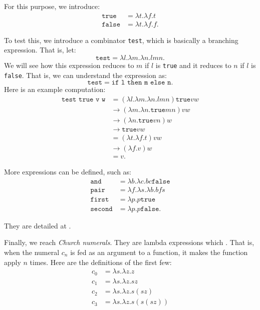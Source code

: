 For this purpose, we introduce:
\begin{align*}
  \texttt{true} &= \lambda t . \lambda f . t \\
  \texttt{false} &= \lambda t . \lambda f . f.
\end{align*}

To test this, we introduce a combinator \texttt{test}, which
is basically a branching expression. That is, let:
\[
  \texttt{test} = \lambda l . \lambda m . \lambda n . lmn.
\]
We will see how this expression reduces to $ m $ if $ l $ is
\texttt{true} and it reduces to $ n $ if $ l $ is \texttt{false}.
That is, we can understand the expression as:
\[
  \texttt{test} = \texttt{if l then m else n}.
\]
Here is an example computation:
\begin{align*}
  \texttt{test true v w} &= (\lambda l . \lambda m . \lambda n . lmn) \texttt{true} v w \\
                         &\to (\lambda m . \lambda n . \texttt{true} m n) v w \\
                         &\to (\lambda n . \texttt{true} v n) w \\
                         &\to \texttt{true} v w \\
                         &= (\lambda t . \lambda f . t) vw \\
                         &\to (\lambda f . v) w \\
                         &= v.
\end{align*}

More expressions can be defined, such as:
\begin{align*}
  \texttt{and} &= \lambda b . \lambda c . bc \texttt{false} \\
  \texttt{pair} &= \lambda f . \lambda s . \lambda b . bfs \\
  \texttt{first} &= \lambda p . p \texttt{true} \\
  \texttt{second} &= \lambda p . p \texttt{false}.
\end{align*}

They are detailed at \cite[pp. 59-60]{tapl}.

Finally, we reach \emph{Church numerals}. They are lambda expressions
which . That is, when the numeral $ c_n $ is fed
as an argument to a function, it makes the function apply $ n $ times.
Here are the definitions of the first few:
\begin{align*}
  c_0 &= \lambda s . \lambda z . z \\
  c_1 &= \lambda s . \lambda z . s z \\
  c_2 &= \lambda s . \lambda z . s (s z) \\
  c_3 &= \lambda s . \lambda z . s (s (s z))
\end{align*}


